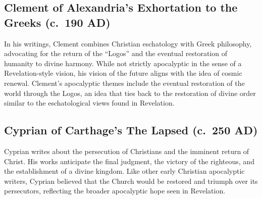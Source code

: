 \subsection{Clement of Alexandria's Exhortation to the Greeks (c.~190 AD)}\label{par:clement-of-alexandrias-exhortation-to-the-greeks-c.-190-ad}

In his writings, Clement combines Christian eschatology with Greek philosophy, advocating for the return of the ``Logos'' and the eventual restoration of humanity to divine harmony.
While not strictly apocalyptic in the sense of a Revelation-style vision, his vision of the future aligns with the idea of cosmic renewal.
Clement's apocalyptic themes include the eventual restoration of the world through the Logos, an idea that ties back to the restoration of divine order similar to the eschatological views found in Revelation.

\subsection{Cyprian of Carthage's The Lapsed (c.~250 AD)}\label{par:cyprian-of-carthages-the-lapsed-c.-250-ad}

Cyprian writes about the persecution of Christians and the imminent return of Christ.
His works anticipate the final judgment, the victory of the righteous, and the establishment of a divine kingdom.
Like other early Christian apocalyptic writers, Cyprian believed that the Church would be restored and triumph over its persecutors, reflecting the broader apocalyptic hope seen in Revelation.
